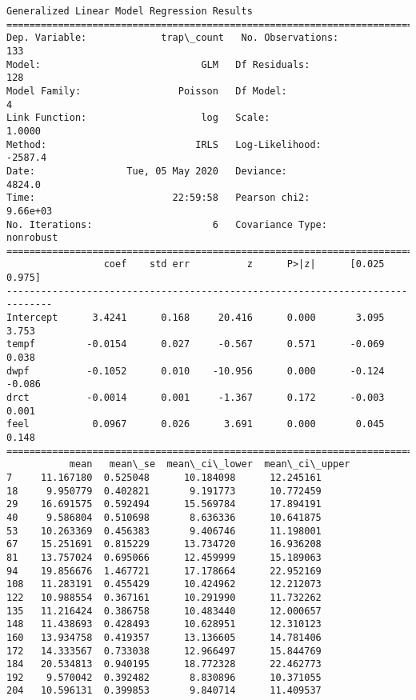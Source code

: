 \documentclass[11pt]{article}
\begin{document}
    \begin{Verbatim}[commandchars=\\\{\}]
                 Generalized Linear Model Regression Results                  
==============================================================================
Dep. Variable:             trap\_count   No. Observations:                  133
Model:                            GLM   Df Residuals:                      128
Model Family:                 Poisson   Df Model:                            4
Link Function:                    log   Scale:                          1.0000
Method:                          IRLS   Log-Likelihood:                -2587.4
Date:                Tue, 05 May 2020   Deviance:                       4824.0
Time:                        22:59:58   Pearson chi2:                 9.66e+03
No. Iterations:                     6   Covariance Type:             nonrobust
==============================================================================
                 coef    std err          z      P>|z|      [0.025      0.975]
------------------------------------------------------------------------------
Intercept      3.4241      0.168     20.416      0.000       3.095       3.753
tempf         -0.0154      0.027     -0.567      0.571      -0.069       0.038
dwpf          -0.1052      0.010    -10.956      0.000      -0.124      -0.086
drct          -0.0014      0.001     -1.367      0.172      -0.003       0.001
feel           0.0967      0.026      3.691      0.000       0.045       0.148
==============================================================================
           mean   mean\_se  mean\_ci\_lower  mean\_ci\_upper
7     11.167180  0.525048      10.184098      12.245161
18     9.950779  0.402821       9.191773      10.772459
29    16.691575  0.592494      15.569784      17.894191
40     9.586804  0.510698       8.636336      10.641875
53    10.263369  0.456383       9.406746      11.198001
67    15.251691  0.815229      13.734720      16.936208
81    13.757024  0.695066      12.459999      15.189063
94    19.856676  1.467721      17.178664      22.952169
108   11.283191  0.455429      10.424962      12.212073
122   10.988554  0.367161      10.291990      11.732262
135   11.216424  0.386758      10.483440      12.000657
148   11.438693  0.428493      10.628951      12.310123
160   13.934758  0.419357      13.136605      14.781406
172   14.333567  0.733038      12.966497      15.844769
184   20.534813  0.940195      18.772328      22.462773
192    9.570042  0.392482       8.830896      10.371055
204   10.596131  0.399853       9.840714      11.409537

\end{Verbatim}
\end{document}
